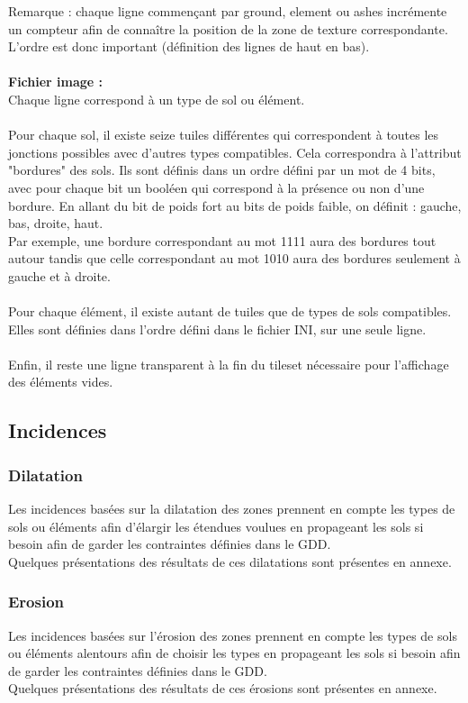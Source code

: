 \documentclass[a4paper]{memoir}
\begin{document}
				Remarque : chaque ligne commençant par ground, element ou ashes incrémente un compteur afin de connaître la position de la zone de texture correspondante. L'ordre est donc important (définition des lignes de haut en bas).\\
				\\
				\textbf{Fichier image :}\\
				Chaque ligne correspond à un type de sol ou élément.\\
				\\
				Pour chaque sol, il existe seize tuiles différentes qui correspondent à toutes les jonctions possibles avec d'autres types compatibles. Cela correspondra à l'attribut "bordures" des sols. Ils sont définis dans un ordre défini par un mot de 4 bits, avec pour chaque bit un booléen qui correspond à la présence ou non d'une bordure. En allant du bit de poids fort au bits de poids faible, on définit : gauche, bas, droite, haut.\\
				Par exemple, une bordure correspondant au mot 1111 aura des bordures tout autour tandis que celle correspondant au mot 1010 aura des bordures seulement à gauche et à droite.\\
				\\
				Pour chaque élément, il existe autant de tuiles que de types de sols compatibles. Elles sont définies dans l'ordre défini dans le fichier INI, sur une seule ligne.\\
				\\
				Enfin, il reste une ligne transparent à la fin du tileset nécessaire pour l'affichage des éléments vides.

			\subsection{Incidences}
				\label{IncidenceT}
				\subsubsection{Dilatation}
					Les incidences basées sur la dilatation des zones prennent en compte les types de sols ou éléments afin d'élargir les étendues voulues en propageant les sols si besoin afin de garder les contraintes définies dans le GDD.\\
					Quelques présentations des résultats de ces dilatations sont présentes en annexe.\\
				
				\subsubsection{Erosion}
					Les incidences basées sur l'érosion des zones prennent en compte les types de sols ou éléments alentours afin de choisir les types en propageant les sols si besoin afin de garder les contraintes définies dans le GDD.\\
					Quelques présentations des résultats de ces érosions sont présentes en annexe.\\
				
\end{document}
